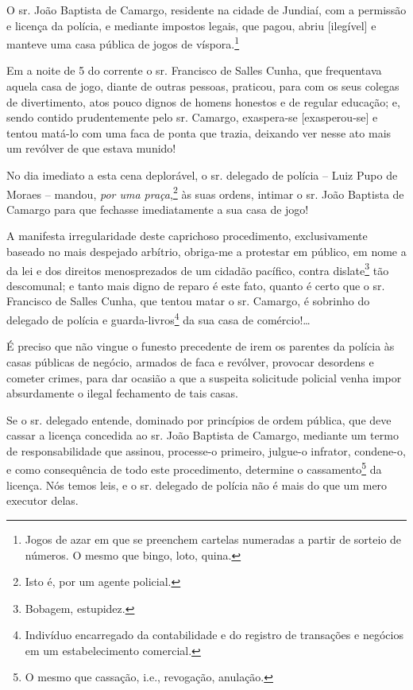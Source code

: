O sr. João Baptista de Camargo, residente na cidade de Jundiaí, com a
permissão e licença da polícia, e mediante impostos legais, que pagou,
abriu {[}ilegível{]} e manteve uma casa pública de jogos de
víspora.\footnote{ Jogos de azar em que se preenchem cartelas numeradas
  a partir de sorteio de números. O mesmo que bingo, loto, quina.}

Em a noite de 5 do corrente o sr. Francisco de Salles Cunha, que
frequentava aquela casa de jogo, diante de outras pessoas, praticou,
para com os seus colegas de divertimento, atos pouco dignos de homens
honestos e de regular educação; e, sendo contido prudentemente pelo sr.
Camargo, exaspera-se {[}exasperou-se{]} e tentou matá-lo com uma faca de
ponta que trazia, deixando ver nesse ato mais um revólver de que estava
munido!

No dia imediato a esta cena deplorável, o sr. delegado de polícia --
Luiz Pupo de Moraes -- mandou, \emph{por uma praça},\footnote{ Isto é,
  por um agente policial.} às suas ordens, intimar o sr. João Baptista
de Camargo para que fechasse imediatamente a sua casa de jogo!

A manifesta irregularidade deste caprichoso procedimento, exclusivamente
baseado no mais despejado arbítrio, obriga-me a protestar em público, em
nome a da lei e dos direitos menosprezados de um cidadão pacífico,
contra dislate\footnote{ Bobagem, estupidez.} tão descomunal; e tanto
mais digno de reparo é este fato, quanto é certo que o sr. Francisco de
Salles Cunha, que tentou matar o sr. Camargo, é sobrinho do delegado de
polícia e guarda-livros\footnote{ Indivíduo encarregado da
  contabilidade e do registro de transações e negócios em um
  estabelecimento comercial.} da sua casa de comércio!\ldots{}

É preciso que não vingue o funesto precedente de irem os parentes da
polícia às casas públicas de negócio, armados de faca e revólver,
provocar desordens e cometer crimes, para dar ocasião a que a suspeita
solicitude policial venha impor absurdamente o ilegal fechamento de tais
casas.

Se o sr. delegado entende, dominado por princípios de ordem pública, que
deve cassar a licença concedida ao sr. João Baptista de Camargo,
mediante um termo de responsabilidade que assinou, processe-o primeiro,
julgue-o infrator, condene-o, e como consequência de todo este
procedimento, determine o cassamento\footnote{ O mesmo que cassação,
  i.e., revogação, anulação.} da licença. Nós temos leis, e o sr.
delegado de polícia não é mais do que um mero executor delas.

